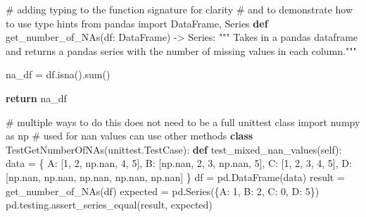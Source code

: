 \documentclass[
  letterpaper,
  DIV=11,
  numbers=noendperiod]{scrartcl}
\newenvironment{Shaded}{\begin{snugshade}}{\end{snugshade}}
\newcommand{\BuiltInTok}[1]{\textcolor[rgb]{0.00,0.23,0.31}{#1}}
\newcommand{\CommentTok}[1]{\textcolor[rgb]{0.37,0.37,0.37}{#1}}
\newcommand{\ControlFlowTok}[1]{\textcolor[rgb]{0.00,0.23,0.31}{\textbf{#1}}}
\newcommand{\DecValTok}[1]{\textcolor[rgb]{0.68,0.00,0.00}{#1}}
\newcommand{\ImportTok}[1]{\textcolor[rgb]{0.00,0.46,0.62}{#1}}
\newcommand{\KeywordTok}[1]{\textcolor[rgb]{0.00,0.23,0.31}{\textbf{#1}}}
\newcommand{\NormalTok}[1]{\textcolor[rgb]{0.00,0.23,0.31}{#1}}
\newcommand{\OperatorTok}[1]{\textcolor[rgb]{0.37,0.37,0.37}{#1}}
\newcommand{\StringTok}[1]{\textcolor[rgb]{0.13,0.47,0.30}{#1}}
\newcommand{\VariableTok}[1]{\textcolor[rgb]{0.07,0.07,0.07}{#1}}
\begin{document}
\begin{Shaded}
\begin{Highlighting}[]
\CommentTok{\# adding typing to the function signature for clarity}
\CommentTok{\# and to demonstrate how to use type hints}
\ImportTok{from}\NormalTok{ pandas }\ImportTok{import}\NormalTok{ DataFrame, Series}
\KeywordTok{def}\NormalTok{ get\_number\_of\_NAs(df: DataFrame) }\OperatorTok{{-}\textgreater{}}\NormalTok{ Series:}
    \CommentTok{"""}
\CommentTok{    Takes in a pandas dataframe and returns a pandas series with the}
\CommentTok{    number of missing values in each column."""}

\NormalTok{    na\_df }\OperatorTok{=}\NormalTok{ df.isna().}\BuiltInTok{sum}\NormalTok{()}

    \ControlFlowTok{return}\NormalTok{ na\_df}

\CommentTok{\# multiple ways to do this does not need to be a full unittest class}
\ImportTok{import}\NormalTok{ numpy }\ImportTok{as}\NormalTok{ np }\CommentTok{\# used for nan values can use other methods}
\KeywordTok{class}\NormalTok{ TestGetNumberOfNAs(unittest.TestCase):}
    \KeywordTok{def}\NormalTok{ test\_mixed\_nan\_values(}\VariableTok{self}\NormalTok{):}
\NormalTok{        data }\OperatorTok{=}\NormalTok{ \{}
            \StringTok{\textquotesingle{}A\textquotesingle{}}\NormalTok{: [}\DecValTok{1}\NormalTok{, }\DecValTok{2}\NormalTok{, np.nan, }\DecValTok{4}\NormalTok{, }\DecValTok{5}\NormalTok{],}
            \StringTok{\textquotesingle{}B\textquotesingle{}}\NormalTok{: [np.nan, }\DecValTok{2}\NormalTok{, }\DecValTok{3}\NormalTok{, np.nan, }\DecValTok{5}\NormalTok{],}
            \StringTok{\textquotesingle{}C\textquotesingle{}}\NormalTok{: [}\DecValTok{1}\NormalTok{, }\DecValTok{2}\NormalTok{, }\DecValTok{3}\NormalTok{, }\DecValTok{4}\NormalTok{, }\DecValTok{5}\NormalTok{],}
            \StringTok{\textquotesingle{}D\textquotesingle{}}\NormalTok{: [np.nan, np.nan, np.nan, np.nan, np.nan]}
\NormalTok{        \}}
\NormalTok{        df }\OperatorTok{=}\NormalTok{ pd.DataFrame(data)}
\NormalTok{        result }\OperatorTok{=}\NormalTok{ get\_number\_of\_NAs(df)}
\NormalTok{        expected }\OperatorTok{=}\NormalTok{ pd.Series(\{}\StringTok{\textquotesingle{}A\textquotesingle{}}\NormalTok{: }\DecValTok{1}\NormalTok{, }\StringTok{\textquotesingle{}B\textquotesingle{}}\NormalTok{: }\DecValTok{2}\NormalTok{, }\StringTok{\textquotesingle{}C\textquotesingle{}}\NormalTok{: }\DecValTok{0}\NormalTok{, }\StringTok{\textquotesingle{}D\textquotesingle{}}\NormalTok{: }\DecValTok{5}\NormalTok{\})}
\NormalTok{        pd.testing.assert\_series\_equal(result, expected)}


\end{Highlighting}
\end{Shaded}
\end{document}
